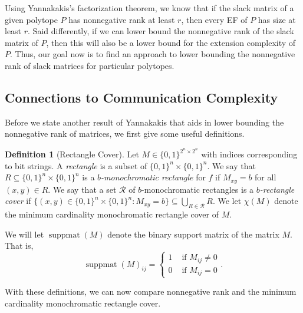 \documentclass{article}
\theoremstyle{definition}
\newtheorem{definition}[theorem]{Definition}
\theoremstyle{remark}
\newcommand{\bits}{\{0,1\}}
\newcommand{\suppmat}{\operatorname{suppmat}}
\begin{document}
Using Yannakakis's factorization theorem, we know that if the slack matrix of a given polytope $P$ has nonnegative rank at least $r$, then every EF of $P$ has size at least $r$. Said differently, if we can lower bound the nonnegative rank of the slack matrix of $P$, then this will also be a lower bound for the extension complexity of $P$. Thus, our goal now is to find an approach to lower bounding the nonnegative rank of slack matrices for particular polytopes. 

\subsection{Connections to Communication Complexity}\label{sec:theorem4}

Before we state another result of Yannakakis that aids in lower bounding the nonnegative rank of matrices, we first give some useful definitions.

\begin{definition}[Rectangle Cover]
Let $M \in \bits^{2^n \times 2^n}$ with indices corresponding to bit strings. A \emph{rectangle} is a subset of $\bits^n \times \bits^n$. We say that $R \subseteq \bits^n \times \bits^n$ is a \emph{$b$-monochromatic rectangle} for $f$ if $M_{xy} = b$ for all $(x,y) \in R$. We say that a set $\mathcal{R}$ of $b$-monochromatic rectangles is a \emph{$b$-rectangle cover} if $\{(x,y) \in \bits^n \times \bits^n : M_{xy} = b\} \subseteq \bigcup_{R \in \mathcal{R}} R$.  We let $\chi(M)$ denote the minimum cardinality monochromatic rectangle cover of $M$.
\end{definition}

We will let $\suppmat(M)$ denote the binary support matrix of the matrix $M$. That is, 
\[
\suppmat(M)_{ij} = \begin{cases}
1 & \text{ if } M_{ij} \ne 0 \\
0 & \text{ if } M_{ij} = 0
\end{cases}.
\]

With these definitions, we can now compare nonnegative rank and the minimum cardinality monochromatic rectangle cover.
\end{document}
